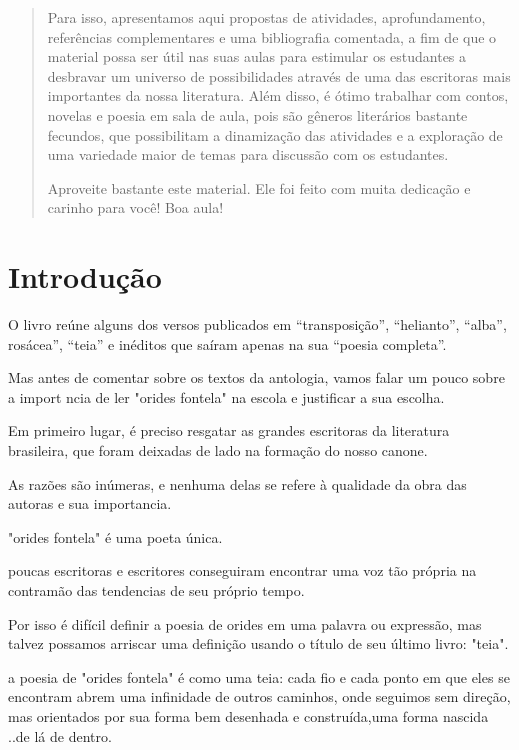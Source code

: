 \documentclass[12pt]{extarticle}
\begin{document}
\begin{abstract}


Para isso, apresentamos aqui propostas de atividades, aprofundamento,
referências complementares e uma bibliografia comentada, a fim de que o
material possa ser útil nas suas aulas para estimular os estudantes a
desbravar um universo de possibilidades através de uma das escritoras
mais importantes da nossa literatura. Além disso, é ótimo trabalhar com
contos, novelas e poesia em sala de aula, pois são gêneros literários
bastante fecundos, que possibilitam a dinamização das atividades e a
exploração de uma variedade maior de temas para discussão com os
estudantes.

Aproveite bastante este material. Ele foi feito com muita dedicação e
carinho para você! Boa aula!
\end{abstract}

\tableofcontents

\section{Introdução} 


O livro reúne alguns dos versos publicados em “transposição”, “helianto”, “alba”, rosácea”, “teia” e inéditos que saíram apenas na sua “poesia completa”.


Mas antes de comentar sobre os textos da antologia, vamos falar um pouco sobre a import ncia de ler "orides fontela" na escola e justificar a sua escolha.


Em primeiro lugar, é preciso resgatar as grandes escritoras da literatura brasileira, que foram deixadas de lado na formação do nosso canone.


As razões são inúmeras, e nenhuma delas se refere à qualidade da obra das autoras e sua importancia.

"orides fontela" é uma poeta única.

poucas escritoras e escritores conseguiram encontrar uma voz tão própria na contramão das tendencias de seu próprio tempo.


Por isso é difícil definir a poesia de orides em uma palavra ou expressão,  mas talvez possamos arriscar uma definição usando o título de seu último livro: "teia".

a poesia de "orides fontela" é como uma teia:  cada fio e cada ponto em que eles se encontram abrem uma infinidade de outros caminhos, onde seguimos sem direção, mas orientados por sua forma bem desenhada e construída,uma forma nascida ..de lá de dentro.
\end{document}
